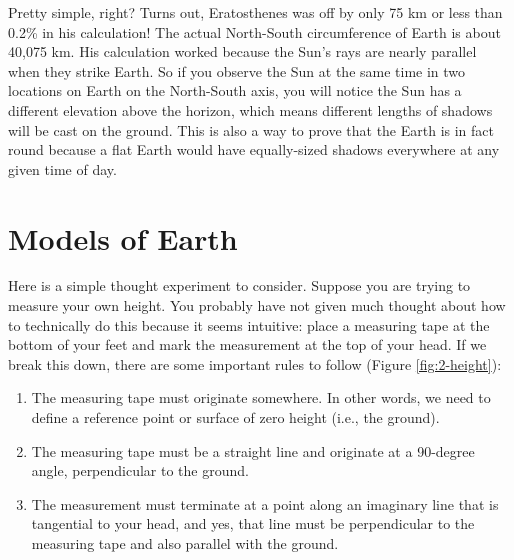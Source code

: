 \documentclass[
]{book}
\providecommand{\tightlist}{%
  \setlength{\itemsep}{0pt}\setlength{\parskip}{0pt}}
\begin{document}
Pretty simple, right? Turns out, Eratosthenes was off by only 75 km or less than 0.2\% in his calculation! The actual North-South circumference of Earth is about 40,075 km. His calculation worked because the Sun's rays are nearly parallel when they strike Earth. So if you observe the Sun at the same time in two locations on Earth on the North-South axis, you will notice the Sun has a different elevation above the horizon, which means different lengths of shadows will be cast on the ground. This is also a way to prove that the Earth is in fact round because a flat Earth would have equally-sized shadows everywhere at any given time of day.

\section{Models of Earth}\label{models-of-earth}

Here is a simple thought experiment to consider. Suppose you are trying to measure your own height. You probably have not given much thought about how to technically do this because it seems intuitive: place a measuring tape at the bottom of your feet and mark the measurement at the top of your head. If we break this down, there are some important rules to follow (Figure \ref{fig:2-height}):

\begin{enumerate}
\def\labelenumi{\arabic{enumi}.}
\tightlist
\item
  The measuring tape must originate somewhere. In other words, we need to define a reference point or surface of zero height (i.e., the ground).
\item
  The measuring tape must be a straight line and originate at a 90-degree angle, perpendicular to the ground.
\item
  The measurement must terminate at a point along an imaginary line that is tangential to your head, and yes, that line must be perpendicular to the measuring tape and also parallel with the ground.
\end{enumerate}
\end{document}
